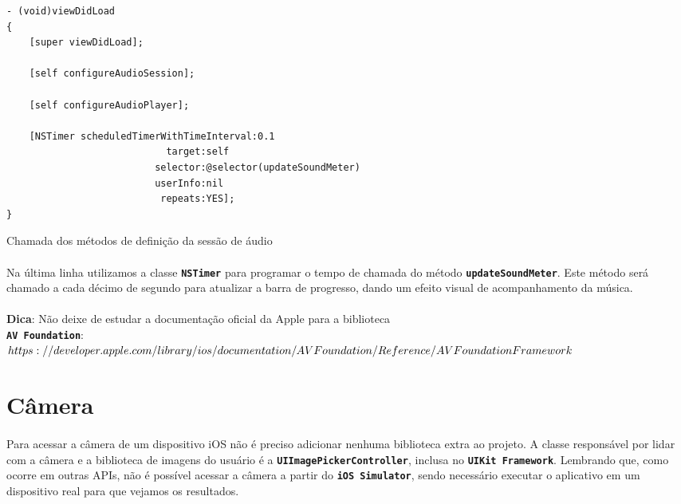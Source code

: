 \documentclass[a4paper,12pt,brazil,doubleside]{book}
\begin{document}
\begin{singlespace}
\begin{listing}[H]
\begin{verbatim}
- (void)viewDidLoad
{
    [super viewDidLoad];
    
    [self configureAudioSession];
    
    [self configureAudioPlayer];
    
    [NSTimer scheduledTimerWithTimeInterval:0.1
                            target:self
                          selector:@selector(updateSoundMeter)
                          userInfo:nil
                           repeats:YES];
}
\end{verbatim}
\caption{Chamada dos métodos de definição da sessão de áudio}
\end{listing}

\paragraph{}Na última linha utilizamos a classe \texttt{\textbf{NSTimer}} para programar o tempo de chamada do método \texttt{\textbf{updateSoundMeter}}. Este método será chamado a cada décimo de segundo para atualizar a barra de progresso, dando um efeito visual de acompanhamento da música.

\bigskip

\begin{framed}
\paragraph{}\textbf{Dica}: Não deixe de estudar a documentação oficial da Apple para a biblioteca\\  \texttt{\textbf{AV Foundation}}:\\
\(https://developer.apple.com/library/ios/documentation/AVFoundation/Reference/\\AVFoundationFramework\)
\end{framed}

\section{Câmera}

\paragraph{}Para acessar a câmera de um dispositivo iOS não é preciso adicionar nenhuma biblioteca extra ao projeto. A classe responsável por lidar com a câmera e a biblioteca de imagens do usuário é a \texttt{\textbf{UIImagePickerController}}, inclusa no \texttt{\textbf{UIKit Framework}}. Lembrando que, como ocorre em outras APIs, não é possível acessar a câmera a partir do \texttt{\textbf{iOS Simulator}}, sendo necessário executar o aplicativo em um dispositivo real para que vejamos os resultados.

\end{singlespace}
\end{document}
